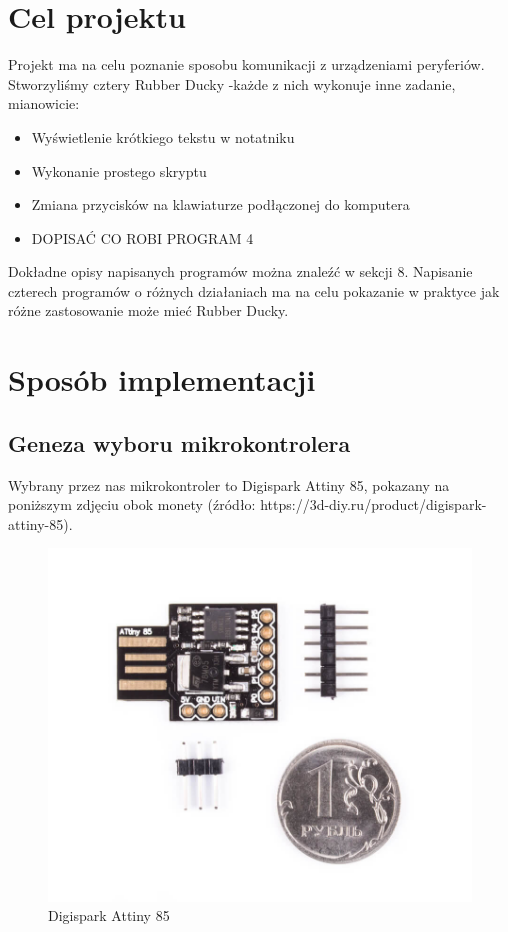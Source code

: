 \documentclass{article}
\begin{document}
\section{Cel projektu}
Projekt ma na celu poznanie sposobu komunikacji z urządzeniami peryferiów. Stworzyliśmy cztery Rubber Ducky -każde z nich wykonuje inne zadanie, mianowicie:
\begin{itemize}
    \item Wyświetlenie krótkiego tekstu w notatniku
    \item Wykonanie prostego skryptu
    \item Zmiana przycisków na klawiaturze podłączonej do komputera
    \item DOPISAĆ CO ROBI PROGRAM 4
\end{itemize}
Dokładne opisy napisanych programów można znaleźć w sekcji 8. Napisanie czterech programów o różnych działaniach ma na celu pokazanie w praktyce jak różne zastosowanie może mieć Rubber Ducky.

\section{Sposób implementacji}
\subsection{Geneza wyboru mikrokontrolera}
Wybrany przez nas mikrokontroler to Digispark Attiny 85, pokazany na poniższym zdjęciu obok monety (źródło: https://3d-diy.ru/product/digispark-attiny-85).

\begin{figure}[h]
    \centering
    \includegraphics[scale=0.2]{Digispark.jpg}
    \caption{Digispark Attiny 85}
    \label{fig:enter-label}
\end{figure}
\end{document}
